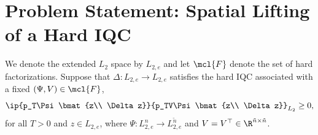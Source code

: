\documentclass[11pt,a4paper,onecolumn]{article}
\theoremstyle{definition}
\theoremstyle{remark}
\begin{document}



\section{Problem Statement: Spatial Lifting of a Hard IQC}

We denote the extended $L_2$ space by $L_{2,e}$ and let $\mcl{F}$
denote the set of hard factorizations. Suppose that
$\Delta:L_{2,e}\to L_{2,e}$ satisfies the hard IQC associated with a
fixed $(\Psi,V)\in\mcl{F}$,
\begin{equation}\label{eqn:temporal-IQC}
    \ip{p_T\Psi\bmat{z\\ \Delta z}}{p_TV\Psi\bmat{z\\ \Delta z}}_{L_2}\geq0,
\end{equation}
for all $T>0$ and $z\in L_{2,e}$, where
$\Psi:L_{2,e}^n\to L_{2,e}^{\tilde n}$ and
$V=V^\top\in\R^{\tilde n\times\tilde n}$.
\end{document}
